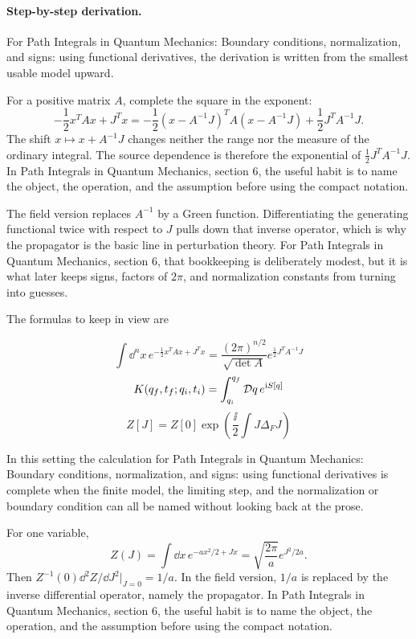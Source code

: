 \paragraph{Step-by-step derivation.}

For Path Integrals in Quantum Mechanics: Boundary conditions, normalization, and signs: using functional derivatives, the derivation is written from the smallest usable model upward.

For a positive matrix \(A\), complete the square in the exponent:
\[
  -\frac12x^TAx+J^Tx
  =
  -\frac12(x-A^{-1}J)^TA(x-A^{-1}J)
  +\frac12J^TA^{-1}J.
\]
The shift \(x\mapsto x+A^{-1}J\) changes neither the range nor the measure of the ordinary integral.  The source dependence is therefore the exponential of \(\frac12J^TA^{-1}J\).  In Path Integrals in Quantum Mechanics, section 6, the useful habit is to name the object, the operation, and the assumption before using the compact notation.

The field version replaces \(A^{-1}\) by a Green function.  Differentiating the generating functional twice with respect to \(J\) pulls down that inverse operator, which is why the propagator is the basic line in perturbation theory.  For Path Integrals in Quantum Mechanics, section 6, that bookkeeping is deliberately modest, but it is what later keeps signs, factors of \(2\pi\), and normalization constants from turning into guesses.

The formulas to keep in view are

\[
  \int\dd^n x\,e^{-\frac12x^TAx+J^Tx}=\frac{(2\pi)^{n/2}}{\sqrt{\det A}}e^{\frac12J^TA^{-1}J}
\]
\[
  K(q_f,t_f;q_i,t_i)=\int_{q_i}^{q_f}\mathcal D q\,e^{\mathrm i S[q]}
\]
\[
  Z[J]=Z[0]\exp\left(\frac{\ii}{2}\int J\Delta_FJ\right)
\]

In this setting the calculation for Path Integrals in Quantum Mechanics: Boundary conditions, normalization, and signs: using functional derivatives is complete when the finite model, the limiting step, and the normalization or boundary condition can all be named without looking back at the prose.




\begin{example}
For one variable,
\[
  Z(J)=\int\dd x\,e^{-ax^2/2+Jx}
  =\sqrt{\frac{2\pi}{a}}e^{J^2/2a}.
\]
Then \(Z^{-1}(0)\dd^2Z/\dd J^2|_{J=0}=1/a\).  In the field version, \(1/a\) is replaced by the inverse differential operator, namely the propagator.  In Path Integrals in Quantum Mechanics, section 6, the useful habit is to name the object, the operation, and the assumption before using the compact notation.
\end{example}




